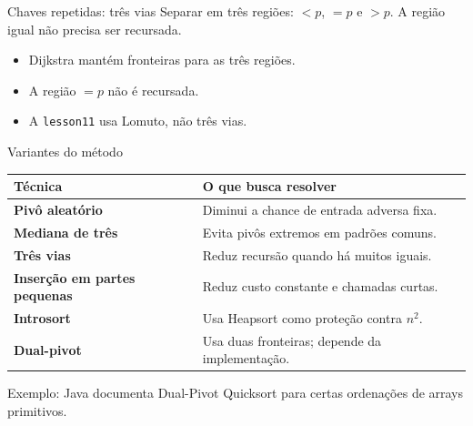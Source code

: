 \documentclass[aspectratio=169,11pt]{beamer}
\newcommand{\citep}[1]{{\color{MidGray}\tiny\cite{#1}}}
\begin{document}
\begin{frame}{Chaves repetidas: três vias}
  \small
  Separar em três regiões: \(<p\), \(=p\) e \(>p\). A região igual não precisa ser recursada.
  \begin{center}
  \end{center}
  \begin{itemize}
    \item Dijkstra mantém fronteiras para as três regiões.
    \item A região \(=p\) não é recursada.
    \item A \texttt{lesson11} usa Lomuto, não três vias.
  \end{itemize}
  \citep{dijkstra1976,bentley1993,sedgwick2011}
\end{frame}

\begin{frame}{Variantes do método}
  \small
  \begin{tabularx}{\textwidth}{>{\bfseries}p{3.1cm} X}
    \toprule
    Técnica & O que busca resolver \\
    \midrule
    Pivô aleatório & Diminui a chance de entrada adversa fixa. \\
    Mediana de três & Evita pivôs extremos em padrões comuns. \\
    Três vias & Reduz recursão quando há muitos iguais. \\
    Inserção em partes pequenas & Reduz custo constante e chamadas curtas. \\
    Introsort & Usa Heapsort como proteção contra \(n^2\). \\
    Dual-pivot & Usa duas fronteiras; depende da implementação. \\
    \bottomrule
  \end{tabularx}
  \vspace{.55em}
  \small
  Exemplo: Java documenta Dual-Pivot Quicksort para certas ordenações de arrays primitivos.
  \citep{musser1997,bentley1993,javaarrays}
\end{frame}
\end{document}
